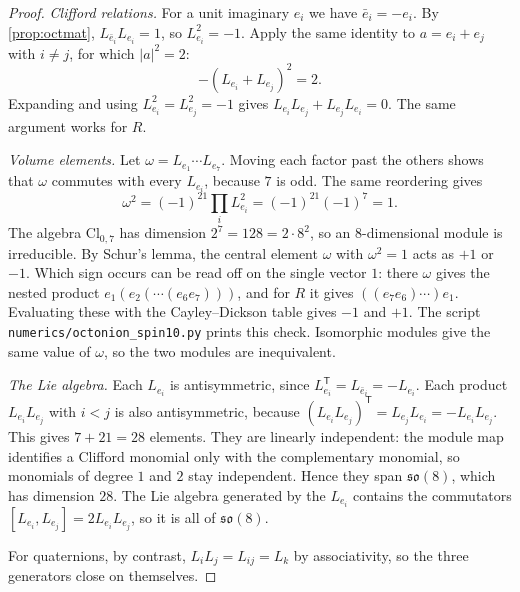 \begin{proof}
\emph{Clifford relations.} For a unit imaginary $e_i$ we have $\bar e_i=-e_i$. By \cref{prop:octmat}, $L_{\bar e_i}L_{e_i}=1$, so $L_{e_i}^2=-1$. Apply the same identity to $a=e_i+e_j$ with $i\ne j$, for which $|a|^2=2$:
\[
-(L_{e_i}+L_{e_j})^2=2 .
\]
Expanding and using $L_{e_i}^2=L_{e_j}^2=-1$ gives $L_{e_i}L_{e_j}+L_{e_j}L_{e_i}=0$. The same argument works for $R$.

\emph{Volume elements.} Let $\omega=L_{e_1}\cdots L_{e_7}$. Moving each factor past the others shows that $\omega$ commutes with every $L_{e_i}$, because $7$ is odd. The same reordering gives
\[
\omega^2=(-1)^{21}\prod_i L_{e_i}^2=(-1)^{21}(-1)^7=1 .
\]
The algebra $\mathrm{Cl}_{0,7}$ has dimension $2^7=128=2\cdot8^2$, so an $8$-dimensional module is irreducible. By Schur's lemma, the central element $\omega$ with $\omega^2=1$ acts as $+1$ or $-1$. Which sign occurs can be read off on the single vector $1$: there $\omega$ gives the nested product $e_1(e_2(\cdots(e_6e_7)))$, and for $R$ it gives $((e_7e_6)\cdots)e_1$. Evaluating these with the Cayley--Dickson table gives $-1$ and $+1$. The script \texttt{numerics/octonion\_spin10.py} prints this check. Isomorphic modules give the same value of $\omega$, so the two modules are inequivalent.

\emph{The Lie algebra.} Each $L_{e_i}$ is antisymmetric, since $L_{e_i}^{\mathsf T}=L_{\bar e_i}=-L_{e_i}$. Each product $L_{e_i}L_{e_j}$ with $i<j$ is also antisymmetric, because $(L_{e_i}L_{e_j})^{\mathsf T}=L_{e_j}L_{e_i}=-L_{e_i}L_{e_j}$. This gives $7+21=28$ elements. They are linearly independent: the module map identifies a Clifford monomial only with the complementary monomial, so monomials of degree $1$ and $2$ stay independent. Hence they span $\mathfrak{so}(8)$, which has dimension $28$. The Lie algebra generated by the $L_{e_i}$ contains the commutators $[L_{e_i},L_{e_j}]=2L_{e_i}L_{e_j}$, so it is all of $\mathfrak{so}(8)$.

For quaternions, by contrast, $L_iL_j=L_{ij}=L_k$ by associativity, so the three generators close on themselves.
\end{proof}


